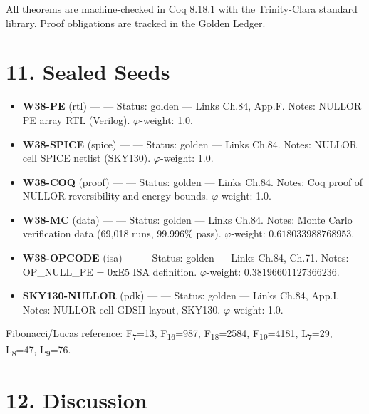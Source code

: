 All theorems are machine-checked in Coq 8.18.1 with the
Trinity-Clara standard library. Proof obligations are tracked in the
Golden Ledger.

\section{11. Sealed Seeds}\label{fa_84:sealed-seeds}

\begin{itemize}
\tightlist
\item
  \textbf{W38-PE} (rtl) ---
   --- Status: golden ---
  Links Ch.84, App.F. Notes: NULLOR PE array RTL (Verilog).
  \(\varphi\)-weight: 1.0.
\item
  \textbf{W38-SPICE} (spice) ---
   --- Status:
  golden --- Links Ch.84. Notes: NULLOR cell SPICE netlist (SKY130).
  \(\varphi\)-weight: 1.0.
\item
  \textbf{W38-COQ} (proof) ---
   ---
  Status: golden --- Links Ch.84. Notes: Coq proof of NULLOR
  reversibility and energy bounds. \(\varphi\)-weight: 1.0.
\item
  \textbf{W38-MC} (data) ---
   ---
  Status: golden --- Links Ch.84. Notes: Monte Carlo verification
  data (69{,}018 runs, 99.996\% pass). \(\varphi\)-weight:
  \(0.618033988768953\).
\item
  \textbf{W38-OPCODE} (isa) ---
   --- Status:
  golden --- Links Ch.84, Ch.71. Notes: OP\_NULL\_PE = 0xE5 ISA
  definition. \(\varphi\)-weight: \(0.38196601127366236\).
\item
  \textbf{SKY130-NULLOR} (pdk) ---
   --- Status:
  golden --- Links Ch.84, App.I. Notes: NULLOR cell GDSII layout,
  SKY130. \(\varphi\)-weight: 1.0.
\end{itemize}

Fibonacci/Lucas reference: F\textsubscript{7}=13, F\textsubscript{16}=987,
F\textsubscript{18}=2584, F\textsubscript{19}=4181,
L\textsubscript{7}=29, L\textsubscript{8}=47,
L\textsubscript{9}=76.

\section{12. Discussion}\label{fa_84:discussion}


